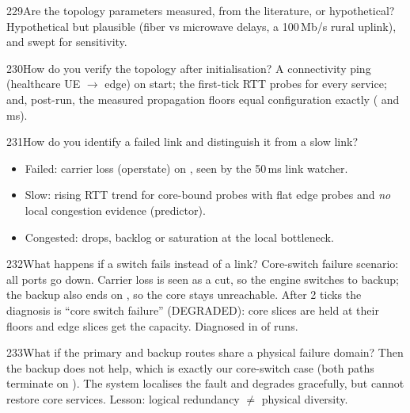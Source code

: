 \begin{qa}{229}{Are the topology parameters measured, from the literature, or hypothetical?}
Hypothetical but plausible (fiber vs microwave delays, a 100\,Mb/s rural uplink), and swept for sensitivity.
\end{qa}

\begin{qa}{230}{How do you verify the topology after initialisation?}
A connectivity ping (healthcare UE $\rightarrow$ edge) on start; the first-tick RTT probes for every service; and,
post-run, the measured propagation floors equal configuration exactly (\NFloorEdge{} and \NFloorCore\,ms).
\end{qa}

\begin{qa}{231}{How do you identify a failed link and distinguish it from a slow link?}
\begin{itemize}
\item Failed: carrier loss (operstate) on , seen by the 50\,ms link watcher.
\item Slow: rising RTT trend for core-bound probes with flat edge probes and \emph{no} local congestion evidence
(predictor).
\item Congested: drops, backlog or saturation at the local bottleneck.
\end{itemize}
\end{qa}

\begin{qa}{232}{What happens if a switch fails instead of a link?}
Core-switch failure scenario: all  ports go down. Carrier loss is seen as a cut, so the engine switches
to backup; the backup also ends on , so the core stays unreachable. After 2 ticks the diagnosis is
``core switch failure'' (\textsf{DEGRADED}): core slices are held at their floors and edge slices get the capacity.
Diagnosed in \NCoreDiagnosedShare{} of runs.
\end{qa}

\begin{qa}{233}{What if the primary and backup routes share a physical failure domain?}
Then the backup does not help, which is exactly our core-switch case (both paths terminate on ). The
system localises the fault and degrades gracefully, but cannot restore core services.
Lesson: logical redundancy $\ne$ physical diversity.
\end{qa}

